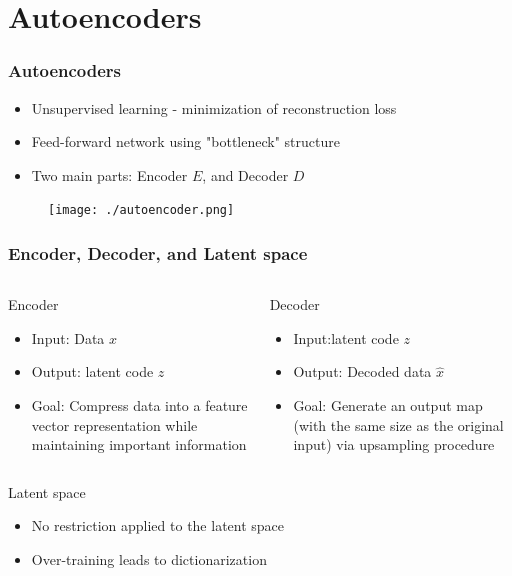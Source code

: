 \section[Autoencoders]{Autoencoders}

\begin{frame}
\frametitle{Autoencoders}
\begin{itemize}
	\item Unsupervised learning - minimization of reconstruction loss
	\item Feed-forward network using "bottleneck" structure
	\item Two main parts: Encoder $E$, and Decoder $D$
\end{itemize}
	\begin{figure}[!ht]
		\centering
		\texttt{[image: ./autoencoder.png]}
	\end{figure}
\end{frame}

\begin{frame}
\frametitle{Encoder, Decoder, and Latent space}
\begin{columns}
	\begin{block}{Encoder}
		\begin{itemize}
			\item Input: Data $x$
			\item Output: latent code $z$
			\item Goal: Compress data into a feature vector representation while maintaining important information
		\end{itemize}
	\end{block}
	\begin{block}{Decoder}
		\begin{itemize}
			\item Input:latent code $z$
			\item Output: Decoded data $\hat{x}$
			\item Goal: Generate an output map (with the same size as the original input) via upsampling procedure
		\end{itemize}
	\end{block}
\end{columns}
\centering
\begin{block}{Latent space}
	\begin{itemize}
		\item No restriction applied to the latent space
		\item Over-training leads to dictionarization  
	\end{itemize}
\end{block}
\end{frame}

